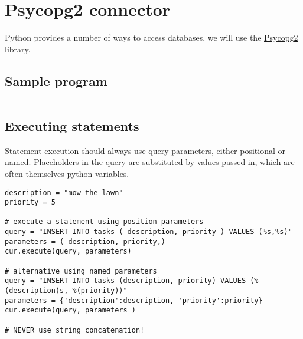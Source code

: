 \section{Psycopg2 connector}
\label{sec:psycopg2-connector}

Python provides a number of ways to access databases, we will use the
\href{https://www.psycopg.org}{Psycopg2} library.

\subsection{Sample program}

\inputminted{python}{connectivity_example.py}

\subsection{Executing statements}
\label{sec:executing-statements}

Statement execution should always use query parameters, either positional or named.
Placeholders in the query are substituted by values passed in, which are often themselves python variables.

\begin{verbatim}
description = "mow the lawn"
priority = 5

# execute a statement using position parameters
query = "INSERT INTO tasks ( description, priority ) VALUES (%s,%s)"
parameters = ( description, priority,) 
cur.execute(query, parameters)

# alternative using named parameters
query = "INSERT INTO tasks (description, priority) VALUES (%(description)s, %(priority))"
parameters = {'description':description, 'priority':priority}
cur.execute(query, parameters )

# NEVER use string concatenation!
\end{verbatim}





